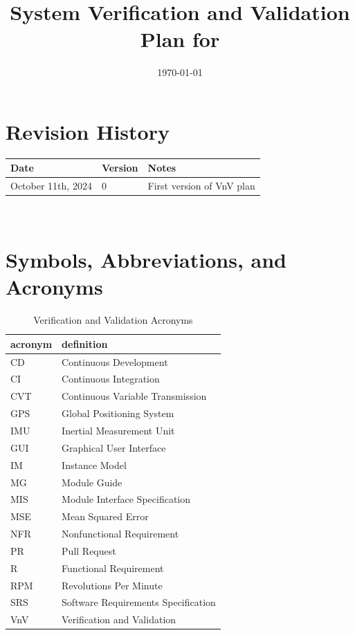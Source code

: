 \documentclass[12pt, titlepage]{article}
\begin{document}
\title{System Verification and Validation Plan for \progname{}} 
\author{\authname}
\date{\today}
	
\maketitle


\section*{Revision History}

\begin{tabularx}{\textwidth}{p{3cm}p{2cm}X}
\toprule {\bf Date} & {\bf Version} & {\bf Notes}\\
\midrule
October 11th, 2024 & 0 & First version of VnV plan\\
\bottomrule
\end{tabularx}

~\\

\newpage

\tableofcontents

\listoftables


\listoffigures


\newpage

\section{Symbols, Abbreviations, and Acronyms}

\begin{table}[h]
  \raggedright
  \begin{tabular}{l l} 
    \toprule		
    \textbf{acronym} & \textbf{definition}\\
    \midrule
    CD & Continuous Development\\
    CI & Continuous Integration\\ 
    CVT & Continuous Variable Transmission\\
    GPS & Global Positioning System\\
    IMU & Inertial Measurement Unit\\
    GUI & Graphical User Interface\\
    IM & Instance Model\\
    MG & Module Guide\\
    MIS & Module Interface Specification\\
    MSE & Mean Squared Error\\
    NFR & Nonfunctional Requirement\\
    PR & Pull Request\\
    R & Functional Requirement\\
    RPM & Revolutions Per Minute\\
    SRS & Software Requirements Specification\\
    VnV & Verification and Validation\\
    \bottomrule
  \end{tabular}
  \caption{Verification and Validation Acronyms}
  \label{tab:vnv_acronyms}
\end{table}
\end{document}
